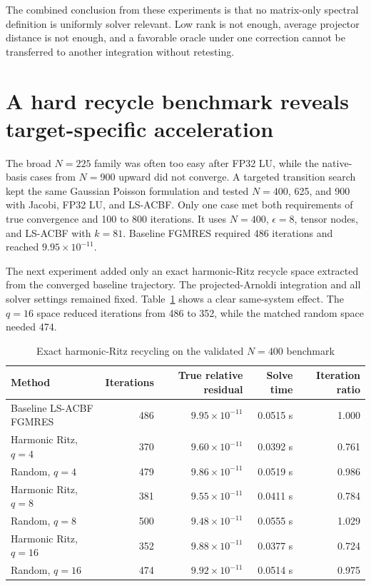 \documentclass[11pt]{article}
\begin{document}
The combined conclusion from these experiments is that no matrix-only spectral definition is uniformly solver relevant. Low rank is not enough, average projector distance is not enough, and a favorable oracle under one correction cannot be transferred to another integration without retesting.

\section{A hard recycle benchmark reveals target-specific acceleration}

The broad $N=225$ family was often too easy after FP32 LU, while the native-basis cases from $N=900$ upward did not converge. A targeted transition search kept the same Gaussian Poisson formulation and tested $N=400$, 625, and 900 with Jacobi, FP32 LU, and LS-ACBF. Only one case met both requirements of true convergence and 100 to 800 iterations. It uses $N=400$, $\epsilon=8$, tensor nodes, and LS-ACBF with $k=81$. Baseline FGMRES required 486 iterations and reached $9.95\times10^{-11}$.

The next experiment added only an exact harmonic-Ritz recycle space extracted from the converged baseline trajectory. The projected-Arnoldi integration and all solver settings remained fixed. Table~\ref{tab:recycle} shows a clear same-system effect. The $q=16$ space reduced iterations from 486 to 352, while the matched random space needed 474.

\begin{table}[H]
\centering
\caption{Exact harmonic-Ritz recycling on the validated $N=400$ benchmark}
\label{tab:recycle}
\small
\begin{tabularx}{\textwidth}{X r r r r}
\toprule
Method & Iterations & True relative residual & Solve time & Iteration ratio \\
\midrule
Baseline LS-ACBF FGMRES & 486 & $9.95\times10^{-11}$ & 0.0515 s & 1.000 \\
Harmonic Ritz, $q=4$ & 370 & $9.60\times10^{-11}$ & 0.0392 s & 0.761 \\
Random, $q=4$ & 479 & $9.86\times10^{-11}$ & 0.0519 s & 0.986 \\
Harmonic Ritz, $q=8$ & 381 & $9.55\times10^{-11}$ & 0.0411 s & 0.784 \\
Random, $q=8$ & 500 & $9.48\times10^{-11}$ & 0.0555 s & 1.029 \\
Harmonic Ritz, $q=16$ & 352 & $9.88\times10^{-11}$ & 0.0377 s & 0.724 \\
Random, $q=16$ & 474 & $9.92\times10^{-11}$ & 0.0514 s & 0.975 \\
\bottomrule
\end{tabularx}
\end{table}
\end{document}
